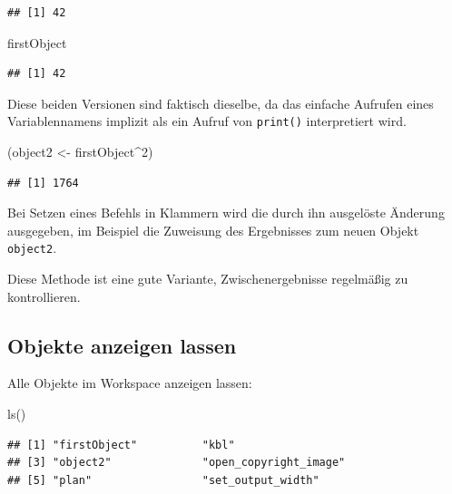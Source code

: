 \documentclass[
]{book}
\newenvironment{Shaded}{\begin{snugshade}}{\end{snugshade}}
\newcommand{\DecValTok}[1]{\textcolor[rgb]{0.00,0.00,0.81}{#1}}
\newcommand{\FunctionTok}[1]{\textcolor[rgb]{0.00,0.00,0.00}{#1}}
\newcommand{\NormalTok}[1]{#1}
\newcommand{\OtherTok}[1]{\textcolor[rgb]{0.56,0.35,0.01}{#1}}
\newcommand{\SpecialCharTok}[1]{\textcolor[rgb]{0.00,0.00,0.00}{#1}}
\begin{document}
\begin{verbatim}
## [1] 42
\end{verbatim}

\begin{Shaded}
\begin{Highlighting}[]
\NormalTok{firstObject}
\end{Highlighting}
\end{Shaded}

\begin{verbatim}
## [1] 42
\end{verbatim}

Diese beiden Versionen sind faktisch dieselbe, da das einfache Aufrufen eines Variablennamens implizit als ein Aufruf von \texttt{print()} interpretiert wird.

\begin{Shaded}
\begin{Highlighting}[]
\NormalTok{(object2 }\OtherTok{\textless{}{-}}\NormalTok{ firstObject}\SpecialCharTok{\^{}}\DecValTok{2}\NormalTok{)}
\end{Highlighting}
\end{Shaded}

\begin{verbatim}
## [1] 1764
\end{verbatim}

Bei Setzen eines Befehls in Klammern wird die durch ihn ausgelöste Änderung ausgegeben, im Beispiel die Zuweisung des Ergebnisses zum neuen Objekt \texttt{object2}.

Diese Methode ist eine gute Variante, Zwischenergebnisse regelmäßig zu kontrollieren.

\hypertarget{objekte-anzeigen-lassen}{%
\subsection*{Objekte anzeigen lassen}\label{objekte-anzeigen-lassen}}

Alle Objekte im Workspace anzeigen lassen:

\begin{Shaded}
\begin{Highlighting}[]
\FunctionTok{ls}\NormalTok{()}
\end{Highlighting}
\end{Shaded}

\begin{verbatim}
## [1] "firstObject"          "kbl"                 
## [3] "object2"              "open_copyright_image"
## [5] "plan"                 "set_output_width"
\end{verbatim}
\end{document}
